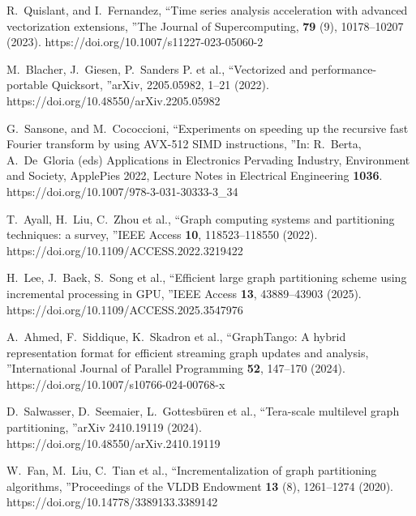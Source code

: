 \documentclass[
11pt,%
tightenlines,%
twoside,%
onecolumn,%
nofloats,%
nobibnotes,%
nofootinbib,%
superscriptaddress,%
noshowpacs,%
centertags]%
{revtex4}
\begin{document}
\begin{thebibliography}{99}
R.~Quislant, and I.~Fernandez, \textquotedblleft Time series analysis acceleration with advanced vectorization extensions, \textquotedblright The Journal of Supercomputing, \textbf{79} (9), 10178--10207 (2023). https://doi.org/10.1007/s11227-023-05060-2

M.~Blacher, J.~Giesen, P.~Sanders P. et al., \textquotedblleft Vectorized and performance-portable Quicksort, \textquotedblright arXiv, 2205.05982, 1--21 (2022). https://doi.org/10.48550/arXiv.2205.05982

G.~Sansone, and M.~Cococcioni, \textquotedblleft Experiments on speeding up the recursive fast Fourier transform by using AVX-512 SIMD instructions, \textquotedblright In: R.~Berta, A.~De~Gloria (eds) Applications in Electronics Pervading Industry, Environment and Society, ApplePies 2022, Lecture Notes in Electrical Engineering \textbf{1036}. https://doi.org/10.1007/978-3-031-30333-3\_34


T.~Ayall, H.~Liu, C.~Zhou et al., \textquotedblleft Graph computing systems and partitioning techniques: a survey, \textquotedblright IEEE Access \textbf{10}, 118523--118550 (2022). https://doi.org/10.1109/ACCESS.2022.3219422

H.~Lee, J.~Baek, S.~Song et al., \textquotedblleft Efficient large graph partitioning scheme using incremental processing in GPU, \textquotedblright IEEE Access \textbf{13}, 43889--43903 (2025). https://doi.org/10.1109/ACCESS.2025.3547976

A.~Ahmed, F.~Siddique, K.~Skadron et al., \textquotedblleft GraphTango: A hybrid representation format for efficient streaming graph updates and analysis, \textquotedblright International Journal of Parallel Programming \textbf{52}, 147--170 (2024). https://doi.org/10.1007/s10766-024-00768-x

D.~Salwasser, D.~Seemaier, L.~Gottesb\"uren et al., \textquotedblleft Tera-scale multilevel graph partitioning, \textquotedblright arXiv 2410.19119 (2024). https://doi.org/10.48550/arXiv.2410.19119

W.~Fan, M.~Liu, C.~Tian et al., \textquotedblleft Incrementalization of graph partitioning algorithms, \textquotedblright Proceedings of the VLDB Endowment \textbf{13} (8), 1261--1274 (2020). https://doi.org/10.14778/3389133.3389142


\end{thebibliography}
\end{document}
